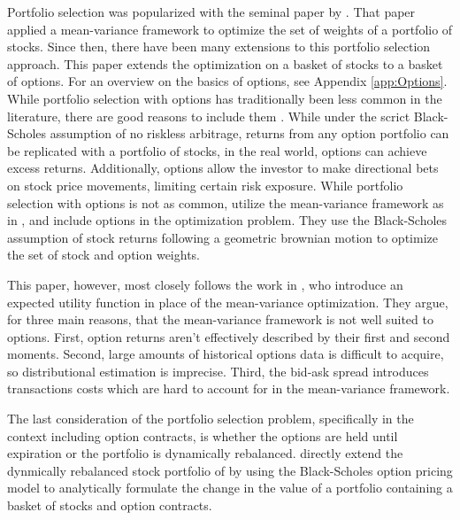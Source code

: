 Portfolio selection was popularized with the seminal paper by \cite{markowitz}. That paper applied a mean-variance framework to optimize the set of weights of a portfolio of stocks. Since then, there have been many extensions to this portfolio selection approach. This paper extends the optimization on a basket of stocks to a basket of options. For an overview on the basics of options, see Appendix \ref{app:Options}. While portfolio selection with options has traditionally been less common in the literature, there are good reasons to include them \cite{zhao2018markowitz}. While under the scrict Black-Scholes assumption of no riskless arbitrage, returns from any option portfolio can be replicated with a portfolio of stocks, in the real world, options can achieve excess returns. Additionally, options allow the investor to make directional bets on stock price movements, limiting certain risk exposure. While portfolio selection with options is not as common, \cite{zhao2018markowitz} utilize the mean-variance framework as in \cite{markowitz}, and include options in the optimization problem. They use the Black-Scholes assumption of stock returns following a geometric brownian motion to optimize the set of stock and option weights. 

This paper, however, most closely follows the work in \cite{faias2017optimal}, who introduce an expected utility function in place of the mean-variance optimization. They argue, for three main reasons, that the mean-variance framework is not well suited to options. First, option returns aren't effectively described by their first and second moments. Second, large amounts of historical options data is difficult to acquire, so distributional estimation is imprecise. Third, the bid-ask spread introduces transactions costs which are hard to account for in the mean-variance framework.

The last consideration of the portfolio selection problem, specifically in the context including option contracts, is whether the options are held until expiration or the portfolio is dynamically rebalanced. \cite{zhao2018markowitz} directly extend the dynmically rebalanced stock portfolio of \cite{markowitz} by using the Black-Scholes option pricing model to analytically formulate the change in the value of a portfolio containing a basket of stocks and option contracts.

